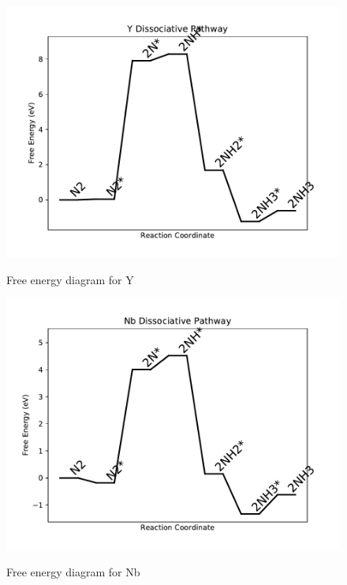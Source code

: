 \documentclass{article}
\begin{document}
\begin{figure}
\includegraphics[width=1\linewidth]{data/plots/Y_dissociative.pdf}
\label{fig:Y_dissociative}
\caption{Free energy diagram for Y}
\end{figure}

\clearpage
\begin{figure}
\includegraphics[width=1\linewidth]{data/plots/Nb_dissociative.pdf}
\label{fig:Nb_dissociative}
\caption{Free energy diagram for Nb}
\end{figure}
\end{document}
